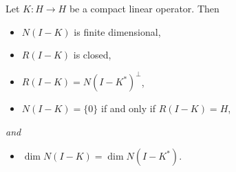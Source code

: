 \begin{theorem}
\label{thm:fredholm-alternative}
Let $K : H \to H$ be a compact linear operator. Then
\begin{itemize}
\item[(i)] $N(I - K)$ is finite dimensional,
\item[(ii)] $R(I - K)$ is closed,
\item[(iii)] $R(I - K) = N(I - K^*)^\perp$,
\item[(iv)] $N(I - K) = \{0\}$ if and only if $R(I - K) = H$,
\end{itemize}
\textit{and}
\begin{itemize}
\item[(v)] $\dim N(I - K) = \dim N(I - K^*)$.
\end{itemize}
\end{theorem}

